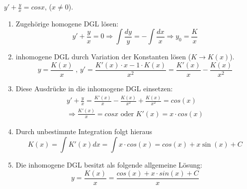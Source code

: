 \begin{bsp}
$y' + \frac{y}{x} = cos x$, ($x \neq 0$).\newline
\begin{enumerate}
	\item Zugehörige homogene DGL lösen:
	$$y' + \frac{y}{x} = 0 \Rightarrow \int \frac{dy}{y} = - \int \frac{dx}{x} \Rightarrow y_0 = \frac{K}{x}$$
	\item inhomogene DGL durch Variation der Konstanten lösen ($K \rightarrow K(x)$).
	$$y = \frac{K(x)}{x}\text{ , } y' = \frac{K'(x) \cdot x -1 \cdot K(x)}{x^2} = \frac{K'(x)}{x} - \frac{K(x)}{x^2}$$
	\item Diese Ausdrücke in die inhomogene DGL einsetzen:
	\begin{align*}
	y' + \frac{y}{x} = \frac{K'(x)}{x} - \frac{K(x)}{x^2} + \frac{K(x)}{x^2} = cos(x) \\
	\Rightarrow \frac{K'(x)}{x} = cos x \text{  oder  } K'(x) = x \cdot cos(x)
	\end{align*}
	
	\item Durch unbestimmte Integration folgt hieraus
	$$K(x) = \int K'(x) dx = \int x \cdot cos (x) = cos(x) + x \sin(x) + C$$
	\item Die inhomogene DGL besitzt als folgende allgemeine Lösung:
	$$y= \frac{K(x)}{x} = \frac{cos(x) + x \cdot sin(x) + C}{x}$$
\end{enumerate}
\end{bsp}